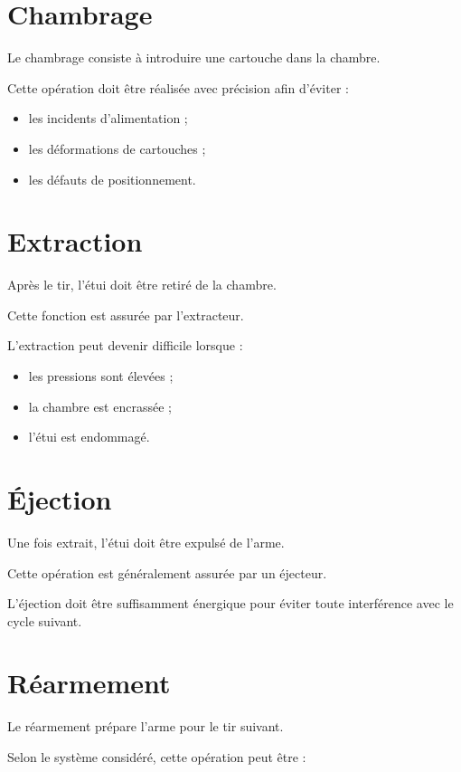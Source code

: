 \section{Chambrage}

Le chambrage consiste à introduire une cartouche dans la chambre.

Cette opération doit être réalisée avec précision afin d'éviter :

\begin{itemize}
    \item les incidents d'alimentation ;
    \item les déformations de cartouches ;
    \item les défauts de positionnement.
\end{itemize}

\section{Extraction}

Après le tir, l'étui doit être retiré de la chambre.

Cette fonction est assurée par l'extracteur.

L'extraction peut devenir difficile lorsque :

\begin{itemize}
    \item les pressions sont élevées ;
    \item la chambre est encrassée ;
    \item l'étui est endommagé.
\end{itemize}

\section{Éjection}

Une fois extrait, l'étui doit être expulsé de l'arme.

Cette opération est généralement assurée par un éjecteur.

L'éjection doit être suffisamment énergique pour éviter toute
interférence avec le cycle suivant.

\section{Réarmement}

Le réarmement prépare l'arme pour le tir suivant.

Selon le système considéré, cette opération peut être :

